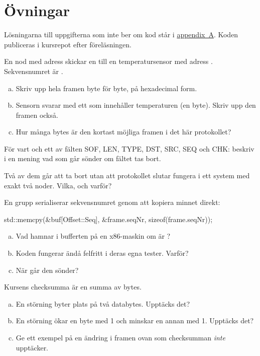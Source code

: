 \section*{Övningar}

Lösningarna till uppgifterna som inte ber om kod står i \hyperref[ch:losningar]{appendix~A}.
Koden publiceras i kursrepot efter föreläsningen.

\label{ex:1:1}
En nod med adress  skickar en  till en temperatursensor med adress
. Sekvensnumret är .
\begin{enumerate}[a)]
  \item Skriv upp hela framen byte för byte, på hexadecimal form.
  \item Sensorn svarar med ett  som innehåller temperaturen 
    (en byte). Skriv upp den framen också.
  \item Hur många bytes är den kortast möjliga framen i det här protokollet?
\end{enumerate}

\label{ex:1:2}
För vart och ett av fälten SOF, LEN, TYPE, DST, SRC, SEQ och CHK: beskriv i en mening vad som
går sönder om fältet tas bort.

Två av dem går att ta bort utan att protokollet slutar fungera i ett system med exakt två noder.
Vilka, och varför?

\label{ex:1:3}
En grupp serialiserar sekvensnumret genom att kopiera minnet direkt:

\begin{cppcode}
std::memcpy(&buf[Offset::Seq], &frame.seqNr, sizeof(frame.seqNr));
\end{cppcode}

\begin{enumerate}[a)]
  \item Vad hamnar i bufferten på en x86-maskin om  är ?
  \item Koden fungerar ändå felfritt i deras egna tester. Varför?
  \item När går den sönder?
\end{enumerate}

\label{ex:1:4}
Kursens checksumma är en summa av bytes.
\begin{enumerate}[a)]
  \item En störning byter plats på två databytes. Upptäcks det?
  \item En störning ökar en byte med 1 och minskar en annan med 1. Upptäcks det?
  \item Ge ett exempel på en ändring i framen ovan som checksumman \emph{inte} upptäcker.
\end{enumerate}
